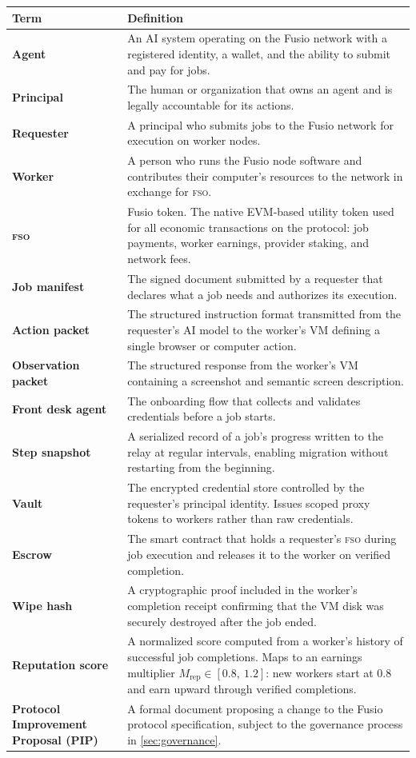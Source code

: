\documentclass[10pt,twocolumn]{article}
\newcommand{\fso}{\textsc{fso}}
\begin{document}
\begin{longtable}{>{\bfseries}p{3.2cm} p{10cm}}
\toprule
Term & Definition \\
\midrule
\endhead
Agent & An AI system operating on the Fusio network with a registered identity, a wallet, and the ability to submit and pay for jobs. \\[4pt]
Principal & The human or organization that owns an agent and is legally accountable for its actions. \\[4pt]
Requester & A principal who submits jobs to the Fusio network for execution on worker nodes. \\[4pt]
Worker & A person who runs the Fusio node software and contributes their computer's resources to the network in exchange for \fso{}. \\[4pt]
\fso{} & Fusio token. The native EVM-based utility token used for all economic transactions on the protocol: job payments, worker earnings, provider staking, and network fees. \\[4pt]
Job manifest & The signed document submitted by a requester that declares what a job needs and authorizes its execution. \\[4pt]
Action packet & The structured instruction format transmitted from the requester's AI model to the worker's VM defining a single browser or computer action. \\[4pt]
Observation packet & The structured response from the worker's VM containing a screenshot and semantic screen description. \\[4pt]
Front desk agent & The onboarding flow that collects and validates credentials before a job starts. \\[4pt]
Step snapshot & A serialized record of a job's progress written to the relay at regular intervals, enabling migration without restarting from the beginning. \\[4pt]
Vault & The encrypted credential store controlled by the requester's principal identity. Issues scoped proxy tokens to workers rather than raw credentials. \\[4pt]
Escrow & The smart contract that holds a requester's \fso{} during job execution and releases it to the worker on verified completion. \\[4pt]
Wipe hash & A cryptographic proof included in the worker's completion receipt confirming that the VM disk was securely destroyed after the job ended. \\[4pt]
Reputation score & A normalized score computed from a worker's history of successful job completions. Maps to an earnings multiplier $M_{\text{rep}} \in [0.8,\ 1.2]$: new workers start at 0.8 and earn upward through verified completions. \\[4pt]
Protocol Improvement Proposal (PIP) & A formal document proposing a change to the Fusio protocol specification, subject to the governance process in \cref{sec:governance}. \\
\bottomrule
\end{longtable}
\end{document}
